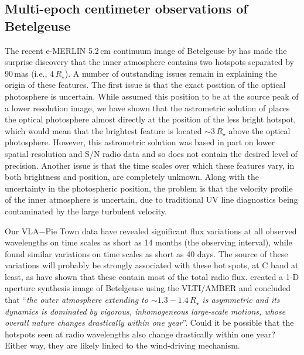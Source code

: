 \subsection{Multi-epoch centimeter observations of Betelgeuse}\label{sec:8.2.2}
The recent e-MERLIN 5.2\,cm continuum image of Betelgeuse by \cite{richards_2013} has made the surprise discovery that the inner atmosphere contains two hotspots separated by 90\,mas (i.e., $4\,R_{\star}$). A number of outstanding issues remain in explaining the origin of these features. The first issue is that the exact position of the optical photosphere is uncertain. While \cite{richards_2013} assumed this position to be at the source peak of a lower resolution image, we have shown that the astrometric solution of \cite{harper_2008} places the optical photosphere almost directly at the position of the less bright hotspot, which would mean that the brightest feature is located $\sim 3\,R_{\star}$ above the optical photosphere. However, this astrometric solution was based in part on lower spatial resolution and S/N radio data and so does not contain the desired level of precision. Another issue is that the time scales over which these features vary, in both brightness and position, are completely unknown.  Along with the uncertainty in the photospheric position, the problem is that the velocity profile of the inner atmosphere is uncertain, due to traditional UV line diagnostics being contaminated by the large turbulent velocity.

Our VLA$-$Pie Town data have revealed significant flux variations at all observed wavelengths on time scales as short as 14 months (the observing interval), while \cite{drake_1992} found similar variations on time scales as short as 40 days. The source of these variations will probably be strongly associated with these hot spots, at C band at least, as \cite{richards_2013} have shown that these contain most of the total radio flux. \cite{ohnaka_2011} created a 1-D aperture synthesis image of Betelgeuse using the VLTI/AMBER and concluded that  ``\textit{the outer atmosphere extending to $\mathit{\sim 1.3 - 1.4\,R_{\star}}$ is asymmetric and its dynamics is dominated by vigorous, inhomogeneous large-scale motions, whose overall nature changes drastically within one year}''. Could it be possible that the hotspots seen at radio wavelengths also  change drastically within one year? Either way, they are likely linked to the wind-driving mechanism.

